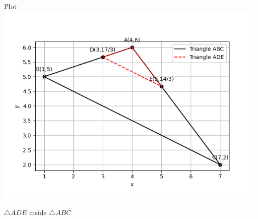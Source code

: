 \documentclass{beamer}
\begin{document}
\begin{frame}{Plot}
\centering
\includegraphics[width=0.6\linewidth]{figs/fig4.png}
\caption{$\triangle ADE$ inside $\triangle ABC$}
\end{frame}
\end{document}
